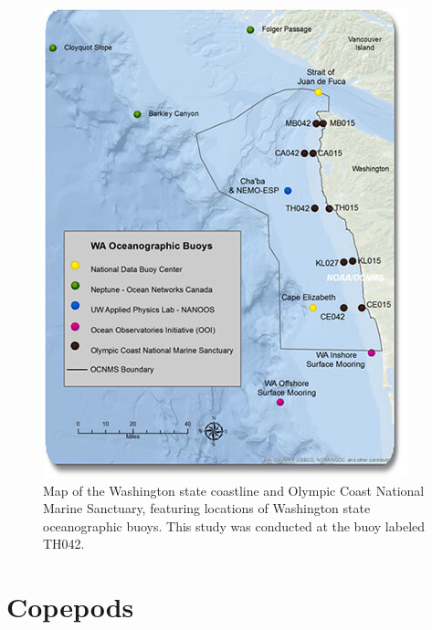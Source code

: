 \documentclass[12pt,twoside]{reedthesis}
\begin{document}
\begin{figure}[htbp]
\begin{center}
		\includegraphics[scale=0.5]{Fig_OCNMS_buoy_map}
		\caption[Map of oceanographic moorings in OCNMS]{\footnotesize{Map of the Washington state coastline and Olympic Coast National Marine Sanctuary, featuring locations of Washington state oceanographic buoys. This study was conducted at the buoy labeled TH042. \autocite{OceanographicMooringsOlympicb}}} %
	\end{center}
	\label{OCNMSbuoys}
\end{figure} 


\section{Copepods}
\end{document}
